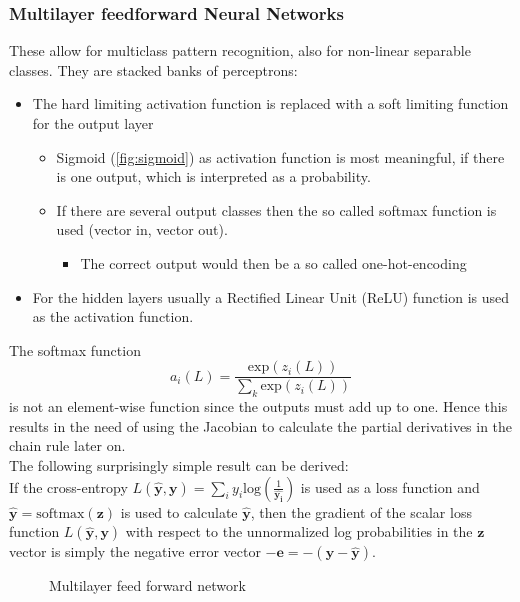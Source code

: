 \subsubsection{Multilayer feedforward Neural Networks}
These allow for multiclass pattern recognition, also for non-linear separable classes.
They are stacked banks of perceptrons:
\begin{itemize}
  \item The hard limiting activation function is replaced with a soft limiting function for the output layer
  \begin{itemize}
    \item Sigmoid (\ref{fig:sigmoid}) as activation function is most meaningful, if there is one output, which is interpreted as a probability.
    \item If there are several output classes then the so called softmax function is used (vector in, vector out).
    \begin{itemize}
      \item The correct output would then be a so called one-hot-encoding
    \end{itemize}
  \end{itemize}
  \item For the hidden layers usually a Rectified Linear Unit (ReLU) function is used as the activation function.
\end{itemize}
The softmax function
\[
  a_i(L) = \frac{\text{exp}(z_i(L))}{\sum_k \text{exp}(z_i(L))}
\]
is not an element-wise function since the outputs must add up to one.
Hence this results in the need of using the Jacobian to calculate the partial derivatives in the chain rule later on.\\
The following surprisingly simple result can be derived:\\
If the cross-entropy $L(\mathbf{\hat{y}},\mathbf{y})=\sum_i y_i \text{log}(\frac{1}{\mathbf{\hat{y_i}}})$ is used as a loss function and $\mathbf{\hat{y}} = \text{softmax}(\mathbf{z})$ is used to calculate $\mathbf{\hat{y}}$, then the gradient of the scalar loss function $L(\mathbf{\hat{y}},\mathbf{y})$ with respect to the unnormalized log probabilities in the $\mathbf{z}$ vector is simply the negative error vector $-\mathbf{e} = -(\mathbf{y}-\mathbf{\hat{y}})$.


\begin{figure}[htp]
\centering

\caption{Multilayer feed forward network}
\end{figure}

